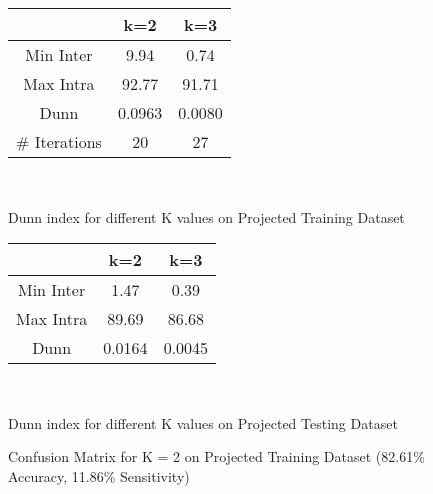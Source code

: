 \documentclass[tikz]{article}
\begin{document}
\begin{figure}[H]
	\centering
	\begin{center}
		\begin{tabular}{|c|c|c|}
		\hline
		 & k=2 & k=3 \\
		\hline
		Min Inter & 9.94 & 0.74 \\
		\hline
		Max Intra & 92.77 & 91.71 \\
		\hline
		Dunn & 0.0963 & 0.0080 \\
		\hline
		\# Iterations & 20 & 27 \\
		\hline
		\end{tabular} \\
		\caption{Dunn index for different K values on Projected Training Dataset}
		\label{fig:dunn1}
	\end{center}
\end{figure}

\begin{figure}[H]
	\centering
	\begin{center}
		\begin{tabular}{|c|c|c|}
		\hline
		 & k=2 & k=3 \\
		\hline
		Min Inter & 1.47 & 0.39 \\
		\hline
		Max Intra & 89.69 & 86.68 \\
		\hline
		Dunn & 0.0164 & 0.0045 \\
		\hline
		\end{tabular} \\
		\caption{Dunn index for different K values on Projected Testing Dataset}
		\label{fig:dunn2}
	\end{center}
\end{figure}


\begin{figure}[H]
	\begin{center}
	\caption{Confusion Matrix for K = 2 on Projected Training Dataset (82.61\% Accuracy, 11.86\% Sensitivity)}
	\label{fig:confusion_kmeans2}
	\end{center}
\end{figure}
\end{document}
